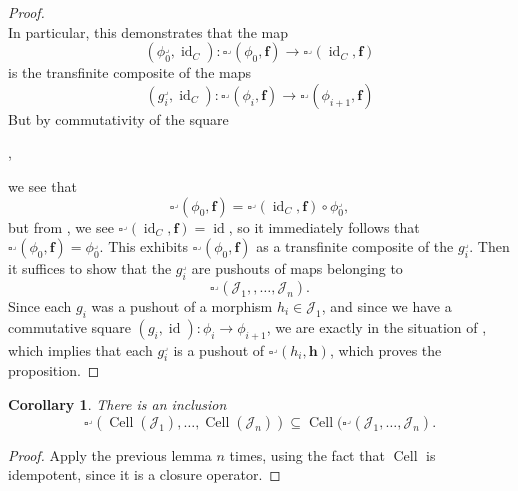 \documentclass[a4paper]{article}
\numberwithin{equation}{subsection}
\theoremstyle{plain}   %
\newtheorem{cor}[equation]{Corollary}
\theoremstyle{definition}
\theoremstyle{remark}
\theoremstyle{plain}
\DeclareMathOperator{\id}{id}
\begin{document}
\begin{proof}
\[	\]
	In particular, this demonstrates that the map
	\[
		(\phi_0^\lrcorner,\id_C):\square^\lrcorner(\phi_0,\mathbf{f}) \to \square^\lrcorner(\id_C,\mathbf{f})
	\]
	is the transfinite composite of the maps 
	\[
		(g_i^\lrcorner,\id_C):\square^\lrcorner(\phi_i,\mathbf{f}) \to \square^\lrcorner(\phi_{i+1},\mathbf{f})
	\]
	But by commutativity of the square
	\begin{center}
		,
	\end{center}
	we see that 
	\[
		\square^\lrcorner(\phi_0,\mathbf{f}) = \square^\lrcorner(\id_C,\mathbf{f}) \circ \phi^\lrcorner_0,
	\] 
	but from , we see \(\square^\lrcorner(\id_C,\mathbf{f})=\id\), so it immediately follows that \(\square^\lrcorner(\phi_0,\mathbf{f}) = \phi^\lrcorner_0\). This exhibits \(\square^\lrcorner(\phi_0,\mathbf{f})\) as a transfinite composite of the \(g^\lrcorner_i\).  
	Then it suffices to show that the \(g_i^\lrcorner\) are pushouts of maps belonging to 
	\[\square^\lrcorner(\mathscr{J}_1,,\dots ,\mathscr{J}_n).\]
	Since each \(g_i\) was a pushout of a morphism \(h_i \in \mathscr{J}_1\), and since we have a commutative square \((g_i,\id):\phi_i\to \phi_{i+1}\), we are exactly in the situation of , which implies that each \(g_i^\lrcorner\) is a pushout of \(\square^\lrcorner(h_i,\mathbf{h})\), which proves the proposition.
\end{proof}
\begin{cor} 
	There is an inclusion
	\[\square^\lrcorner(\operatorname{Cell}(\mathscr{J}_1),\dots,\operatorname{Cell}(\mathscr{J}_n)) \subseteq \operatorname{Cell}(\square^\lrcorner(\mathscr{J}_1,\dots,\mathscr{J}_n).\]
\end{cor}
\begin{proof} 
	Apply the previous lemma \(n\) times, using the fact that \(\operatorname{Cell}\) is idempotent, since it is a closure operator.
\end{proof}
\end{document}
